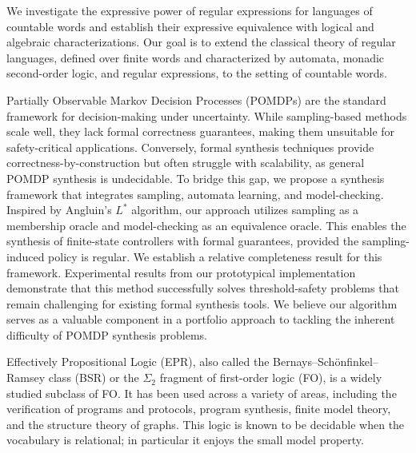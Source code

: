 \documentclass[a4paper,UKenglish]{dagrep-v2021}
\begin{document}

We investigate the expressive power of regular expressions for languages of countable words and establish their expressive equivalence with logical and algebraic characterizations. Our goal is to extend the classical theory of regular languages, defined over finite words and characterized by automata, monadic second-order logic, and regular expressions, to the setting of countable words.


Partially Observable Markov Decision Processes (POMDPs) are the standard framework for decision-making under uncertainty. While sampling-based methods scale well, they lack formal correctness guarantees, making them unsuitable for safety-critical applications. Conversely, formal synthesis techniques provide correctness-by-construction but often struggle with scalability, as general POMDP synthesis is undecidable. To bridge this gap, we propose a synthesis framework that integrates sampling, automata learning, and model-checking. Inspired by Angluin's $L^*$ algorithm, our approach utilizes sampling as a membership oracle and model-checking as an equivalence oracle. This enables the synthesis of finite-state controllers with formal guarantees, provided the sampling-induced policy is regular. We establish a relative completeness result for this framework. Experimental results from our prototypical implementation demonstrate that this method successfully solves threshold-safety problems that remain challenging for existing formal synthesis tools. We believe our algorithm serves as a valuable component in a portfolio approach to tackling the inherent difficulty of POMDP synthesis problems.


Effectively Propositional Logic (EPR), also called the Bernays--Sch\"onfinkel--Ramsey class (BSR) or the $\Sigma_2$ fragment of first-order logic (FO), is a widely studied subclass of FO. It has been used across a variety of areas, including the verification of programs and protocols, program synthesis, finite model theory, and the structure theory of graphs. This logic is known to be decidable when the vocabulary is relational; in particular it enjoys the small model property.
\end{document}
